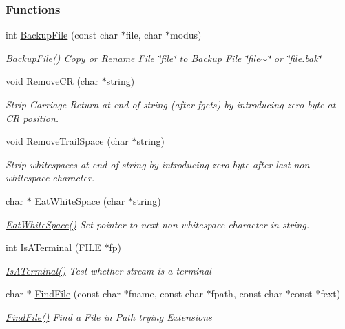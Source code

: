 \subsubsection*{Functions}
\begin{DoxyCompactItemize}
\item 
int \hyperlink{group__utilities_ga0fccda7427db33b2f73a3b6dca864207}{Backup\-File} (const char $\ast$file, char $\ast$modus)
\begin{DoxyCompactList}\small\item\em \hyperlink{group__utilities_ga0fccda7427db33b2f73a3b6dca864207}{Backup\-File()} Copy or Rename File {\ttfamily \char`\"{}file\char`\"{}} to Backup File {\ttfamily \char`\"{}file$\sim$\char`\"{}} or {\ttfamily \char`\"{}file.\-bak\char`\"{}} \end{DoxyCompactList}\item 
void \hyperlink{group__utilities_ga6ddbeec7bf1d9a94c65cd5ff1e0a9f19}{Remove\-C\-R} (char $\ast$string)
\begin{DoxyCompactList}\small\item\em Strip Carriage Return at end of string (after fgets) by introducing zero byte at C\-R position. \end{DoxyCompactList}\item 
void \hyperlink{group__utilities_ga10200b38583a83087a15432c95567cd4}{Remove\-Trail\-Space} (char $\ast$string)
\begin{DoxyCompactList}\small\item\em Strip whitespaces at end of string by introducing zero byte after last non-\/whitespace character. \end{DoxyCompactList}\item 
char $\ast$ \hyperlink{group__utilities_ga3b3af548ae02da377ed0a3092e670fd4}{Eat\-White\-Space} (char $\ast$string)
\begin{DoxyCompactList}\small\item\em \hyperlink{group__utilities_ga3b3af548ae02da377ed0a3092e670fd4}{Eat\-White\-Space()} Set pointer to next non-\/whitespace-\/character in string. \end{DoxyCompactList}\item 
int \hyperlink{group__utilities_ga9a90e738d03b642f33901600671d225a}{Is\-A\-Terminal} (F\-I\-L\-E $\ast$fp)
\begin{DoxyCompactList}\small\item\em \hyperlink{group__utilities_ga9a90e738d03b642f33901600671d225a}{Is\-A\-Terminal()} Test whether stream is a terminal \end{DoxyCompactList}\item 
char $\ast$ \hyperlink{group__utilities_ga59fc2b29cf26051e0854b664f5aed15d}{Find\-File} (const char $\ast$fname, const char $\ast$fpath, const char $\ast$const $\ast$fext)
\begin{DoxyCompactList}\small\item\em \hyperlink{group__utilities_ga59fc2b29cf26051e0854b664f5aed15d}{Find\-File()} Find a File in Path trying Extensions \end{DoxyCompactList}\end{DoxyCompactItemize}


